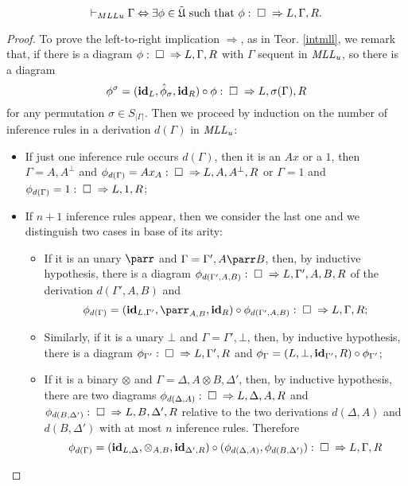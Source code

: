 \documentclass[a4paper]{article}
\begin{document}
\begin{theorem}\label{corrMLLc}
$$\vdash_{MLLu} \Gamma \Leftrightarrow \exists \phi \in {\tilde{\mathfrak{U}}} \mbox{ such that } \phi: \; \square \; \Rightarrow L,\Gamma, R.$$

\begin{proof}
To prove the left-to-right implication $\Rightarrow$, as in Teor. \ref{intmll}, we remark that, if there is a diagram $\phi: \; \square \; \Rightarrow L, \Gamma, R$ with $\Gamma$ sequent in $\mathit{MLL_u}$, so there is a diagram 
$$\phi^\sigma= (\textbf{id}_L ,\hat \phi_\sigma, \textbf{id}_R) \circ \phi: \; \square \; \Rightarrow L,\sigma(\Gamma), R $$
 for any permutation $\sigma\in S_{|\Gamma|}$. Then we proceed by induction on the number of inference rules in a derivation $d(\Gamma)$ in $\mathit{MLL_u}$:
\begin{itemize}

\item If just one inference rule occurs $d(\Gamma)$, then it is an $Ax$ or a $1$, then $\Gamma=A,A^\bot$ and $\phi_{d(\Gamma)}=Ax_A: \; \square \; \Rightarrow L,A, A^\bot , R$ or $\Gamma= 1$ and $\phi_{d(\Gamma)}= 1: \; \square \; \Rightarrow L, 1,R$;

\item If $n+1$ inference rules appear, then we consider the last one and we distinguish two cases in base of its arity:


\begin{itemize}


\item If it is an unary $\parr$ and $ \Gamma= \Gamma', A\parr B$, then, by inductive hypothesis, there is a diagram $\phi_{d(\Gamma',A,B)}: \; \square \; \Rightarrow L, \Gamma',A,B, R$ of the derivation $d( \Gamma',A,B)$ and 
$$\phi_{d(\Gamma)}=(\id_{L,\Gamma'},\parr_{A,B},\id_R) \circ \phi_{d(\Gamma',A,B)}: \pro \frr L, \Gamma, R ;$$


\item Similarly, if it is a unary $\bot$ and $\Gamma= \Gamma', \bot$, then, by inductive  hypothesis, there is a  diagram $\phi_{\Gamma'}: \; \square \; \Rightarrow L, \Gamma', R$ and $\phi_\Gamma= (L,\bot, \textbf{id}_{\Gamma'},  R) \circ \phi_{\Gamma'}$;


\item If it is a binary $\otimes$ and $ \Gamma=\Delta, A\otimes B, \Delta'$, then, by inductive hypothesis, there are two diagrams $\phi_{d(\Delta, A)}:\; \square \; \Rightarrow L, \Delta, A, R$ and $\phi_{d(B, \Delta')}:\; \square \; \Rightarrow L, B ,\Delta', R$ relative to the two derivations $d(\Delta, A)$ and $d(B, \Delta')$ with at most $n$ inference rules. Therefore
$$\phi_{d(\Gamma)}=(\textbf{id}_{L,\Delta},\otimes_{A,B}, \textbf{id}_{\Delta',R}) \circ (\phi_{d(\Delta, A)} , \phi_{d(B, \Delta')}): \; \square \; \Rightarrow L, \Gamma, R $$


\end{itemize}
\end{itemize}
\end{proof}
\end{theorem}
\end{document}
